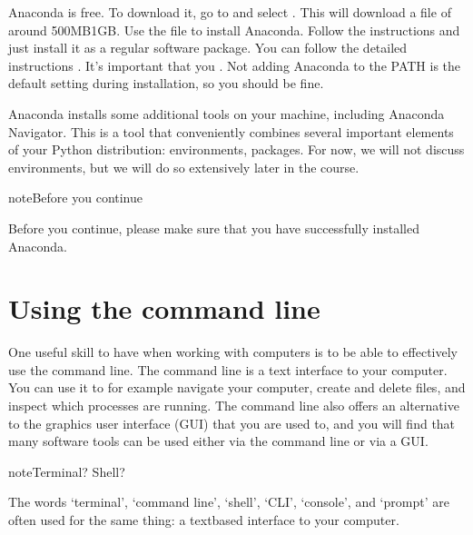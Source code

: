 \documentclass[letterpaper,10pt,english]{jupyterBook}
\begin{document}
\sphinxAtStartPar
Anaconda is free. To download it, go to  and select . This will download a file of around 500MB\sphinxhyphen{}1GB. Use the file to install Anaconda. Follow the instructions and just install it as a regular software package. You can follow the detailed instructions . It’s important that you . Not adding Anaconda to the PATH is the default setting during installation, so you should be fine.

\sphinxAtStartPar
{}

\sphinxAtStartPar
Anaconda installs some additional tools on your machine, including Anaconda Navigator. This is a tool that conveniently combines several important elements of your Python distribution: environments, packages. For now, we will not discuss environments, but we will do so extensively later in the course.

\begin{sphinxadmonition}{note}{Before you continue}

\sphinxAtStartPar
Before you continue, please make sure that you have successfully installed Anaconda.
\end{sphinxadmonition}


\section{Using the command line}
\label{\detokenize{notebooks/01_GettingStarted/01_GettingStarted_student:using-the-command-line}}
\sphinxAtStartPar
One useful skill to have when working with computers is to be able to effectively use the command line. The command line is a text interface to your computer. You can use it to \sphinxhyphen{} for example \sphinxhyphen{} navigate your computer, create and delete files, and inspect which processes are running. The command line also offers an alternative to the graphics user interface (GUI) that you are used to, and you will find that many software tools can be used either via the command line or via a GUI.

\begin{sphinxadmonition}{note}{Terminal? Shell?}

\sphinxAtStartPar
The words ‘terminal’, ‘command line’, ‘shell’, ‘CLI’, ‘console’, and ‘prompt’ are often used for the same thing: a text\sphinxhyphen{}based interface to your computer.
\end{sphinxadmonition}
\end{document}
